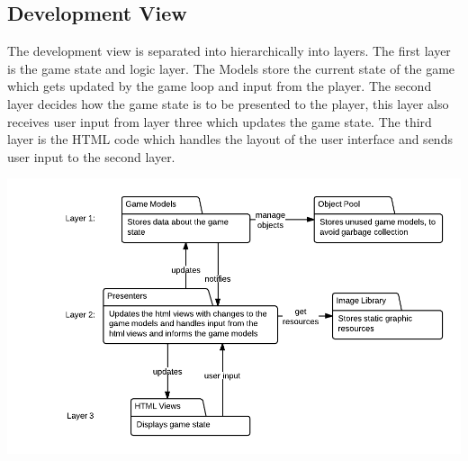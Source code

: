 \subsection{Development View}

	The development view is separated into hierarchically into layers. The first layer is the game state 
	and logic layer. The Models store the current state of the game which gets updated by the game loop 
	and input from the player. The second layer decides how the game state is to be presented to the 
	player, this layer also receives user input from layer three which updates the game state. The third 
	layer is the HTML code which handles the layout of the user interface and sends user input to the
	second layer.

	\includegraphics[width=\textwidth]{pictures/development_view}
